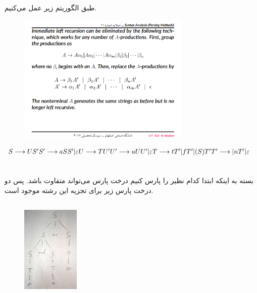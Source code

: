 \documentclass{article}
\begin{document}
\subsection{}
طبق الگوریتم زیر عمل می‌کنیم.
\begin{figure}[H]
    \centering
    \includegraphics[width=0.75\textwidth]{figures/1b.png}
    \caption
	{}
    \label{fig:fig1}
\end{figure}

\begin{latin}
$
S \longrightarrow US ^ \prime \\
S ^ \prime \longrightarrow aSS ^ \prime | \varepsilon \\
U \longrightarrow TU ^ \prime \\
U ^ \prime \longrightarrow uUU ^ \prime | \varepsilon \\
T \longrightarrow tT ^ \prime | fT ^ \prime | (S)T ^ \prime \\
T ^ \prime \longrightarrow | nT ^ \prime | \varepsilon
$
\end{latin}

\section{}%
بسته به اینکه ابتدا کدام  نظیر  را پارس کنیم درخت پارس می‌تواند متفاوت باشد. پس دو درخت پارس زیر برای تجزیه این رشته موجود است.

\subsection{}
\begin{figure}[H]
    \centering
    \includegraphics[width=0.25\textwidth]{figures/c1.jpg}
    \caption
	{}
    \label{fig:fig1}
\end{figure}
\end{document}
